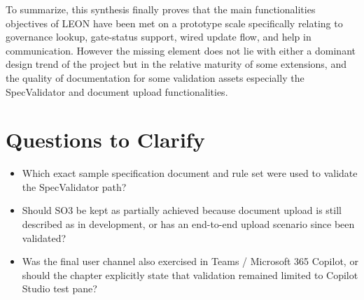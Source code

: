 To summarize, this synthesis finally proves that the main functionalities objectives of LEON have been met on a prototype scale specifically relating to governance lookup, gate-status support, wired update flow, and help in communication. However the missing element does not lie with either a dominant design trend of the project but in the relative maturity of some extensions, and the quality of documentation for some validation assets especially the SpecValidator and document upload functionalities. 
\section*{Questions to Clarify}

\begin{itemize}
	\item Which exact sample specification document and rule set were used to validate the SpecValidator path?
	\item Should SO3 be kept as partially achieved because document upload is still described as in development, or has an end-to-end upload scenario since been validated?
	\item Was the final user channel also exercised in Teams / Microsoft 365 Copilot, or should the chapter explicitly state that validation remained limited to Copilot Studio test pane?
\end{itemize}


